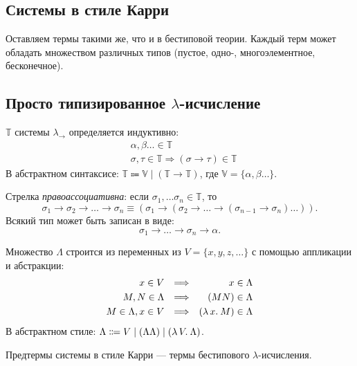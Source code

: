 \documentclass[11pt,a4paper]{article}
\begin{document}
\subsection{Системы в стиле Карри}
Оставляем термы такими же, что и в бестиповой теории. Каждый терм может обладать множеством различных типов (пустое, одно-, многоэлементное, бесконечное).
\subsection{Просто типизированное $ \lambda $-исчисление}
\begin{defn}
	 $ \mathbb{T}$ системы $ \lambda_{\to}$ определяется индуктивно:
	\begin{align*}
		& \alpha , \beta \ldots \in \mathbb{T} \tag{переменные типа} \\
		& \sigma , \tau \in \mathbb{T} \Rightarrow (\sigma \to \tau) \in \mathbb{T} \tag{типы пространства функций}
	\end{align*}
	В абстрактном синтаксисе: $ \mathbb{T} \Coloneqq \mathbb{V \mid (T \to T)}$, где $ \mathbb{V} = \{ \alpha , \beta \ldots \}$.
\end{defn}
Стрелка \textit{правоассоциативна}: если $ \sigma_1 ,\ldots \sigma _n \in \mathbb{T}$, то
\[
	\sigma _1 \to \sigma _2 \to  \ldots \to \sigma _n \equiv (\sigma_1 \to ( \sigma _2 \to  \ldots \to (\sigma_{n-1} \to  \sigma _n)\ldots ))
.\] 
Всякий тип может быть записан в виде:
\[
\sigma _1 \to  \ldots \to \sigma _n \to  \alpha 
.\] 

\begin{defn}[Предтермы]
	Множество  $ \Lambda$ строится из переменных из $ V = \{x, y, z, \ldots \}$ с помощью аппликации и абстракции:
	\[
	\begin{aligned}
		x \in V && \Longrightarrow && x \in \Lambda \\
		M, N \in \Lambda && \Longrightarrow && (MN) \in \Lambda \\
		M \in \Lambda, x \in V && \Longrightarrow && (\lambda\,{x}.\:{M}) \in \Lambda
	\end{aligned}
	\]
	В абстрактном стиле: $ \Lambda \Coloneqq V \mid (\Lambda \Lambda) \mid (\lambda\,{V}.\:{\Lambda})$.
\end{defn}
Предтермы системы в стиле Карри --- термы бестипового $ \lambda $-исчисления.
\end{document}
